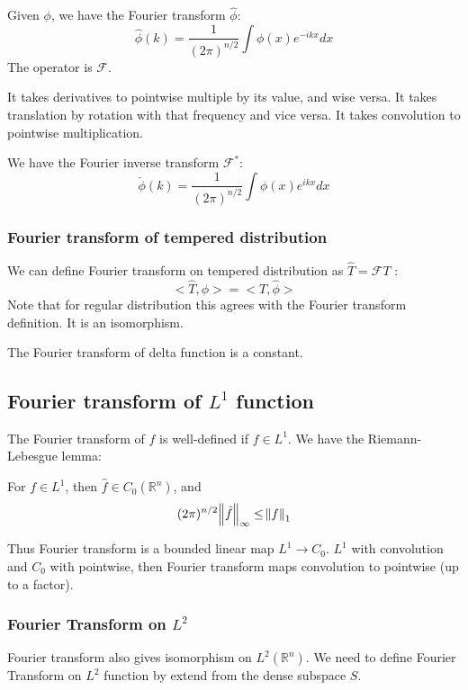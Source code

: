 \documentclass[main.tex]{subfiles}
\begin{document}
\begin{definition}
Given $\phi$, we have the Fourier transform $\hat{\phi}$:
$$
\hat{\phi}(k) = \frac{1}{(2\pi)^{n/2}}\int \phi(x)e^{-i k x} dx
$$
The operator is $\mathcal{F}$.
\end{definition}

It takes derivatives to pointwise multiple by its value, and wise versa. It takes translation by rotation with that frequency and vice versa. It takes convolution to pointwise multiplication.

We have the Fourier inverse transform $\mathcal{F}^*$:
$$
\check{\phi}(k) = \frac{1}{(2\pi)^{n/2}}\int \phi(x)e^{i k x} dx
$$

\subsubsection{Fourier transform of tempered distribution}

We can define Fourier transform on tempered distribution as $\hat{T} = \mathcal{F} T$ :
$$
<\hat{T}, \phi> = <T, \hat{\phi}>
$$
Note that for regular distribution this agrees with the Fourier transform definition.
It is an isomorphism. 

The Fourier transform of delta function is a constant.

\subsection{Fourier transform of $L^1$ function}

The Fourier transform of $f$ is well-defined if $f \in L^1$. 
We have the Riemann-Lebesgue lemma:
\begin{theorem}
For $f \in L^1$, then $\hat{f} \in C_0(\mathbb{R}^n)$, and 
$$
(2\pi)^{n/2} \norm{\hat{f}}_\infty \leq \norm{f}_1
$$
\end{theorem}

Thus Fourier transform is a bounded linear map $L^1 \rightarrow C_0$. $L^1$ with convolution and $C_0$ with pointwise, then Fourier transform maps convolution to pointwise (up to a factor). 

\subsubsection{Fourier Transform on $L^2$}
Fourier transform also gives isomorphism on $L^2(\mathbb{R}^n)$.  We need to define Fourier Transform on $L^2$ function by extend from the dense subspace $S$.
\end{document}
